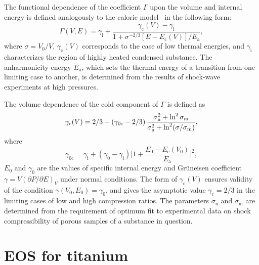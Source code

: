 \documentclass[a4paper]{jpconf}
\begin{document}
The functional dependence of the coefficient $\Gamma$ upon the volume and internal energy is defined analogously to the caloric model~\cite{Bushman-Fortov-Lomonosov-1991-proc} in the following form:
%
\begin{equation}\label{Gamma}
\Gamma(V,E)=\gamma_\mathrm{i}+\frac{\gamma_\mathrm{c}(V)-\gamma_\mathrm{i}}{1+\sigma^{-2/3}\left[E-E_\mathrm{c}(V)\right]/E_\mathrm{a}},
\end{equation}
%
where $\sigma=V_{0}/V$, $\gamma_\mathrm{c}(V)$ corresponds to the case of low thermal energies, and $\gamma_\mathrm{i}$ characterizes the region of highly heated condensed substance. The anharmonicity energy $E_\mathrm{a}$, which sets the thermal energy of a transition from one limiting case to another, is determined from the results of shock-wave experiments at high pressures.

The volume dependence of the cold component of $\Gamma$ is defined as \cite{Bushman-Lomonosov-Fortov-Khishchenko-Zhernokletov-Sutulov-JETP-1996}
%
\begin{equation}\label{gamma_{c}}
\gamma_\mathrm{c}(V)=2/3+\left(\gamma_\mathrm{0c}-2/3\right)\frac{\sigma_\mathrm{n}^2+\ln^2 \sigma_\mathrm{m}}{\sigma_\mathrm{n}^2+\ln^2 (\sigma/\sigma_\mathrm{m})},
\end{equation}
%
where
%
\begin{equation}\label{gamma_0c}
\gamma_\mathrm{0c}=\gamma_\mathrm{i}+\left(\gamma_0-\gamma_\mathrm{i}\right)\bigg[1+\frac{E_0-E_\mathrm{c}(V_0)}{E_\mathrm{a}}\bigg]^2,
\end{equation}
%
$E_0$ and $\gamma_0$ are the values of specific internal energy and Gr\"uneisen coefficient $\gamma=V(\partial P/\partial E)_V$ under normal conditions. The form of $\gamma_\mathrm{c}(V)$ ensures validity of the condition $\gamma(V_0,E_0)=\gamma_0$, and gives the asymptotic value $\gamma_\mathrm{c}=2/3$ in the limiting cases of low and high compression ratios. The parameters $\sigma_\mathrm{n}$ and $\sigma_\mathrm{m}$ are determined from the requirement of optimum fit to experimental data on shock compressibility of porous samples of a substance in question.


\section{EOS for titanium}
\end{document}
